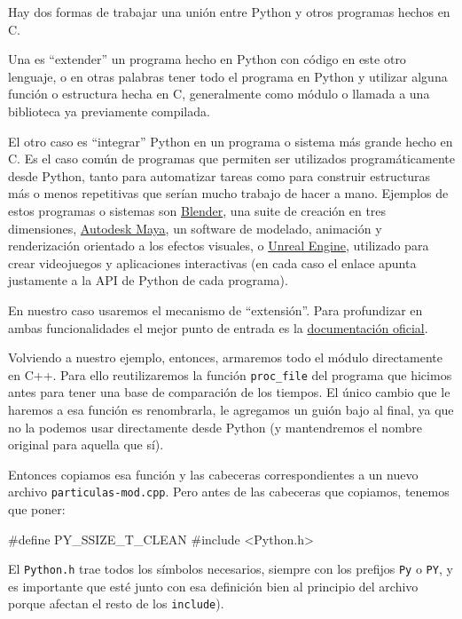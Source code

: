 Hay dos formas de trabajar una unión entre Python y otros programas hechos en C.

Una es ``extender'' un programa hecho en Python con código en este otro lenguaje, o en otras palabras tener todo el programa en Python y utilizar alguna función o estructura hecha en C, generalmente como módulo o llamada a una biblioteca ya previamente compilada.

El otro caso es ``integrar'' Python en un programa o sistema más grande hecho en C. Es el caso común de programas que permiten ser utilizados programáticamente desde Python, tanto para automatizar tareas como para construir estructuras más o menos repetitivas que serían mucho trabajo de hacer a mano. Ejemplos de estos programas o sistemas son \href{https://docs.blender.org/api/current/}{Blender}, una suite de creación en tres dimensiones, \href{https://help.autodesk.com/cloudhelp/2023/ENU/Maya-Tech-Docs/CommandsPython/}{Autodesk Maya}, un software de modelado, animación y renderización orientado a los efectos visuales, o \href{https://docs.unrealengine.com/4.27/en-US/PythonAPI/}{Unreal Engine}, utilizado para crear videojuegos y aplicaciones interactivas (en cada caso el enlace apunta justamente a la API de Python de cada programa).

En nuestro caso usaremos el mecanismo de ``extensión''. Para profundizar en ambas funcionalidades el mejor punto de entrada es la \href{https://docs.python.org/es/dev/extending/index.html}{documentación oficial}.

Volviendo a nuestro ejemplo, entonces, armaremos todo el módulo directamente en C++. Para ello reutilizaremos la función \texttt{proc\_file} del programa que hicimos antes para tener una base de comparación de los tiempos. El único cambio que le haremos a esa función es renombrarla, le agregamos un guión bajo al final, ya que no la podemos usar directamente desde Python (y mantendremos el nombre original para aquella que sí).

Entonces copiamos esa función y las cabeceras correspondientes a un nuevo archivo \texttt{particulas-mod.cpp}. Pero antes de las cabeceras que copiamos, tenemos que poner:

\begin{cpp}
#define PY_SSIZE_T_CLEAN
#include <Python.h>
\end{cpp}

El \texttt{Python.h} trae todos los símbolos necesarios, siempre con los prefijos \texttt{Py} o \texttt{PY}, y es importante que esté junto con esa definición bien al principio del archivo porque afectan el resto de los \texttt{include}).

